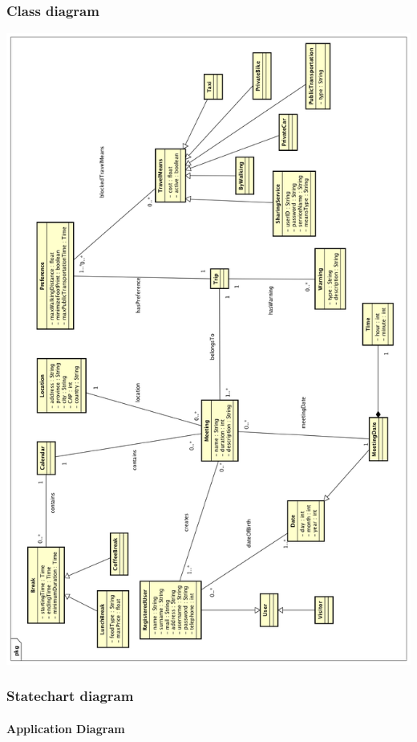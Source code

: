 \documentclass[12pt,titlepage]{article}
\begin{document}
\subsubsection{Class diagram}\label{sec:mod1}
\includegraphics[scale=0.36]{"Class Diagram"} 
 
\subsubsection{Statechart diagram }
\paragraph{Application Diagram} \mbox{}\\ 
 
\end{document}
